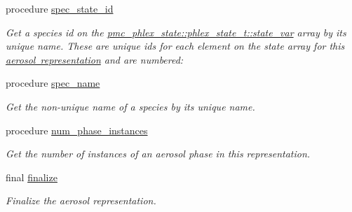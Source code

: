 \begin{DoxyCompactItemize}
procedure \mbox{\hyperlink{structpmc__aero__rep__modal__binned__mass_1_1aero__rep__modal__binned__mass__t_aaa4d131524eb4c9f2bff96d8948caa4f}{spec\+\_\+state\+\_\+id}}
\begin{DoxyCompactList}\small\item\em Get a species id on the {\ttfamily \mbox{\hyperlink{structpmc__phlex__state_1_1phlex__state__t_a78835cb552d483ebbfc7a6bc6f756918}{pmc\+\_\+phlex\+\_\+state\+::phlex\+\_\+state\+\_\+t\+::state\+\_\+var}}} array by its unique name. These are unique ids for each element on the state array for this \mbox{\hyperlink{phlex_aero_rep}{aerosol representation}} and are numbered\+: \end{DoxyCompactList}\item 
procedure \mbox{\hyperlink{structpmc__aero__rep__modal__binned__mass_1_1aero__rep__modal__binned__mass__t_ab56e76308ccc81ab3cd193419733759a}{spec\+\_\+name}}
\begin{DoxyCompactList}\small\item\em Get the non-\/unique name of a species by its unique name. \end{DoxyCompactList}\item 
procedure \mbox{\hyperlink{structpmc__aero__rep__modal__binned__mass_1_1aero__rep__modal__binned__mass__t_a9e7e5d529daaf4067883a3bbe24b90dd}{num\+\_\+phase\+\_\+instances}}
\begin{DoxyCompactList}\small\item\em Get the number of instances of an aerosol phase in this representation. \end{DoxyCompactList}\item 
final \mbox{\hyperlink{structpmc__aero__rep__modal__binned__mass_1_1aero__rep__modal__binned__mass__t_ad8bf1dc9ee795364a0f3d903ab0b8f0e}{finalize}}
\begin{DoxyCompactList}\small\item\em Finalize the aerosol representation. \end{DoxyCompactList}\end{DoxyCompactItemize}
